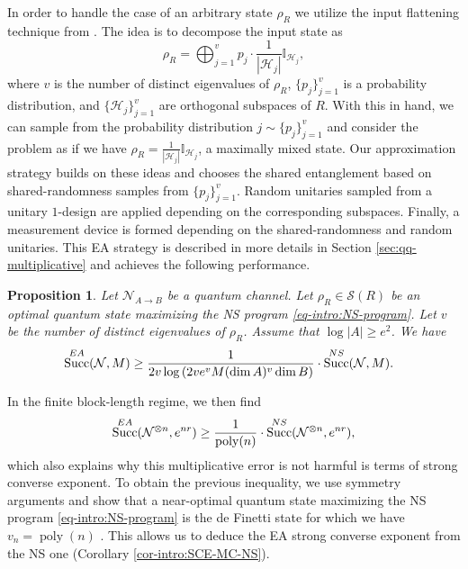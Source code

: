 \documentclass[a4paper,onecolumn,11pt,accepted=2025-10-01]{quantumarticle}
\newtheorem{prop}[theorem]{Proposition}
\DeclareMathOperator{\suc}{Succ}
\newcommand*{\cH}{\mathcal{H}}
\newcommand*{\dI}{\mathbb{I}}
\newcommand*{\cN}{\mathcal{N}}
\newcommand*{\cS}{\mathcal{S}}
\begin{document}
In order to handle the case of an arbitrary state $\rho_R$ we utilize the input flattening technique from \cite{Li2024Jul}. The idea is to decompose the input state as 
\begin{equation}
    \rho_R = \bigoplus_{j=1}^v p_j \cdot  \frac{1}{|{\cH_j}|} \dI_{\cH_j},
\end{equation}
where $v$ is the number of distinct eigenvalues of $\rho_R$, $\{p_j\}_{j=1}^v$ is a probability distribution, and $\{\cH_j\}_{j=1}^v$ are orthogonal subspaces of $R$. 
With this in hand, we can sample from the probability distribution $j\sim \{p_j\}_{j=1}^v$ and consider the problem as if we have $\rho_R = \frac{1}{|{\cH_j}|} \dI_{\cH_j}$, a maximally mixed state. Our approximation strategy builds on these ideas and chooses the shared entanglement based on shared-randomness samples from $\{p_j\}_{j=1}^v$. Random unitaries sampled from a unitary $1$-design are applied depending on the corresponding subspaces. Finally, a measurement device is formed depending on the shared-randomness and random unitaries. This EA strategy is described in more details in Section \ref{sec:qq-multiplicative} and achieves the following performance.

\begin{prop}\label{prop-intro:qq-rounding}
Let $\cN_{A\rightarrow B}$ be a quantum channel. 
Let $\rho_R \in \cS(R)$ be an optimal  quantum state maximizing the NS program \eqref{eq-intro:NS-program}. 
Let $v$ be the number of distinct eigenvalues of $\rho_R$. Assume that $\log|A|\ge e^2$.  
    We have 
    \begin{align}
        &\suc^{\rm{EA}}(\cN,M) 
        \ge \frac{1}{2v \log\left(2v e^{v} M (\dim A)^{v}\dim B\right)}\cdot\suc^{\rm{NS}}(\cN,M) .
    \end{align}
\end{prop}

In the finite block-length regime, we then find
\begin{align}
\suc^{\rm{EA}}(\cN^{\otimes n},e^{nr}) \ge\frac{1}{\operatorname{poly}(n)}\cdot\suc^{\rm{NS}}(\cN^{\otimes n},e^{nr}),
\end{align}
which also explains why this multiplicative error is not harmful is terms of strong converse exponent. To obtain the previous inequality, we use symmetry arguments and show that a near-optimal  quantum state maximizing the NS program \eqref{eq-intro:NS-program} is the de Finetti state \cite{christandl2009postselection} for which we have  $v_n  =  \operatorname{poly}(n)$ \cite{Hayashi2016Oct}. This allows us to deduce the EA strong converse exponent from the NS one (Corollary \ref{cor-intro:SCE-MC-NS}).
\end{document}
